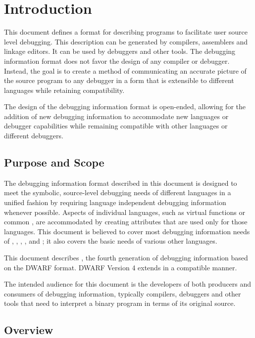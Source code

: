 \chapter{Introduction}
\label{chap:introduction}
This document defines a format for describing programs to
facilitate user source level debugging. This description
can be generated by compilers, assemblers and linkage
editors. 
It can be used by debuggers and other tools. 
The
debugging information format does not favor the design of any
compiler or debugger. 
Instead, the goal is to create a method
of communicating an accurate picture of the source program
to any debugger in a form that is extensible to different
languages while retaining compatibility.
  
The design of the
debugging information format is open-ended, allowing for
the addition of new debugging information to accommodate new
languages or debugger capabilities while remaining compatible
with other languages or different debuggers.

\section{Purpose and Scope}
The debugging information format described in this document is
designed to meet the symbolic, source-level debugging needs of
different languages in a unified fashion by requiring language
independent debugging information whenever possible.  
Aspects
of individual languages, such as  virtual functions or
 common 
, are accommodated by creating attributes
that are used only for those languages. 
This document is
believed to cover most debugging information needs of 
,
, , , 
and ; it also covers the basic needs
of various other languages.

This document describes ,
the fourth generation
of debugging information based on the DWARF format. DWARF
Version 4 extends 
in a compatible manner.

The intended audience for this document is the developers
of both producers and consumers of debugging information,
typically compilers, debuggers and other tools that need to
interpret a binary program in terms of its original source.


\section{Overview}

